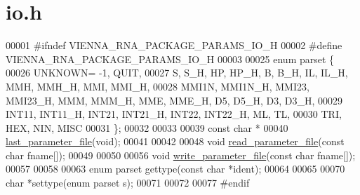 \hypertarget{io_8h_source}{}\section{io.\+h}
\label{io_8h_source}

\begin{DoxyCode}
00001 \textcolor{preprocessor}{#ifndef VIENNA\_RNA\_PACKAGE\_PARAMS\_IO\_H}
00002 \textcolor{preprocessor}{#define VIENNA\_RNA\_PACKAGE\_PARAMS\_IO\_H}
00003 
00025 \textcolor{keyword}{enum} parset \{
00026   UNKNOWN= -1, QUIT,
00027   S, S\_H, HP, HP\_H, B, B\_H, IL, IL\_H, MMH, MMH\_H, MMI, MMI\_H,
00028   MMI1N, MMI1N\_H, MMI23, MMI23\_H, MMM, MMM\_H, MME, MME\_H, D5, D5\_H, D3, D3\_H,
00029   INT11, INT11\_H, INT21, INT21\_H, INT22, INT22\_H, ML, TL,
00030   TRI, HEX, NIN, MISC
00031 \};
00032 
00033 
00039 \textcolor{keyword}{const} \textcolor{keywordtype}{char} *
00040 \hyperlink{group__energy__parameters__rw_ga5abafd7bad6d506e18bed13b18123cfe}{last\_parameter\_file}(\textcolor{keywordtype}{void});
00041 
00042 
00048 \textcolor{keywordtype}{void}  \hyperlink{group__energy__parameters__rw_ga165a142a3c68fb6655c69ef4ab7cd749}{read\_parameter\_file}(\textcolor{keyword}{const} \textcolor{keywordtype}{char} fname[]);
00049 
00050 
00056 \textcolor{keywordtype}{void}  \hyperlink{group__energy__parameters__rw_ga8a43459be386a7489feeab68dc2c6c76}{write\_parameter\_file}(\textcolor{keyword}{const} \textcolor{keywordtype}{char} fname[]);
00057 
00058 
00063 \textcolor{keyword}{enum}  parset gettype(\textcolor{keyword}{const} \textcolor{keywordtype}{char} *ident);
00064 
00065 
00070 \textcolor{keywordtype}{char} *settype(\textcolor{keyword}{enum} parset s);
00071 
00072 
00077 \textcolor{preprocessor}{#endif}
\end{DoxyCode}
